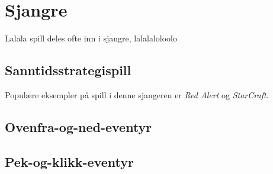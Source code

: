 \section{Sjangre}
Lalala spill deles ofte inn i sjangre, lalalaloloolo

	\subsection{Sanntidsstrategispill}

	Populære eksempler på spill i denne sjangeren er \emph{Red Alert} og \emph{StarCraft}.


 	\subsection{Ovenfra-og-ned-eventyr}
 	\subsection{Pek-og-klikk-eventyr}